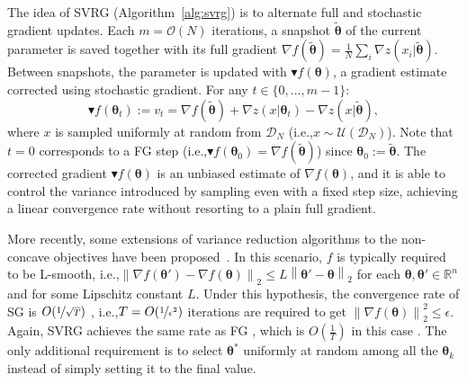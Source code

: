 \documentclass{article}
\makeatletter
\theoremstyle{remark}
\theoremstyle{definition}
\DeclareRobustCommand{\eg}{e.g.,\@\xspace}
\DeclareRobustCommand{\ie}{i.e.,\@\xspace}
\newcommand{\realspace}{\mathbb R}      %
\newcommand{\norm}[2][\infty]{\left\|#2\right\|_{#1}}
\newcommand{\vtheta}{\boldsymbol{\theta}}
\newcommand{\wt}[1]{\widetilde{#1}}
\makeatother
\begin{document}
The idea of SVRG (Algorithm~\ref{alg:svrg}) is to alternate full and stochastic gradient updates. 
Each $m = \mathcal{O}(N)$ iterations, a snapshot $\widetilde{\vtheta}$ of the current parameter is saved together with its full gradient $\nabla f(\widetilde{\vtheta}) = \frac{1}{N} \sum_i \nabla z(x_i|\widetilde{\vtheta})$.
Between snapshots, the parameter is updated with $\blacktriangledown f(\vtheta)$, a gradient estimate corrected using stochastic gradient. For any $t \in \{0,\ldots,m-1\}$:
\begin{equation}\label{E:svrg.gradient.correction}
        \blacktriangledown f(\vtheta_{t}) := v_t = \nabla f(\wt{\vtheta}) + \nabla z(x | \vtheta_t) - \nabla z(x | \wt{\vtheta}),
\end{equation} 
where $x$ is sampled uniformly at random from $\mathcal{D}_N$ (\ie $x \sim \mathcal{U}(\mathcal{D}_N)$).
Note that $t=0$ corresponds to a FG step (\ie $\blacktriangledown f(\vtheta_0) = \nabla f(\wt{\vtheta})$) since $\vtheta_0 := \wt{\vtheta}$.
The corrected gradient $\blacktriangledown f(\vtheta)$ is an unbiased estimate of $\nabla f(\vtheta)$, and it is able to control the variance introduced by sampling even with a fixed step size, achieving a linear convergence rate without resorting to a plain full gradient.

More recently, some extensions of variance reduction algorithms to the non-concave objectives have been proposed~\citep[\eg][]{allen2016variance,reddi2016stochastic,reddi2016fast}. In this scenario, $f$ is typically required to be L-smooth, \ie $\norm[2]{\nabla f(\vtheta') - \nabla f(\vtheta)} \leq L\norm[2]{\vtheta'-\vtheta}$ for each $\vtheta,\vtheta'\in\realspace^n$ and for some Lipschitz constant $L$. Under this hypothesis, the convergence rate of SG is $O(\nicefrac{1}{\sqrt{T}})$ \cite{ghadimi2013stochastic}, \ie $T=O(\nicefrac{1}{\epsilon^2})$ iterations are required to get $\norm[2]{\nabla f(\vtheta)}^2\leq\epsilon$. Again, SVRG achieves the same rate as FG \cite{reddi2016stochastic}, which is $O(\frac{1}{T})$ in this case \cite{nesterov2013introductory}. The only additional requirement is to select $\vtheta^*$ uniformly at random among all the $\vtheta_k$ instead of simply setting it to the final value.
\end{document}
